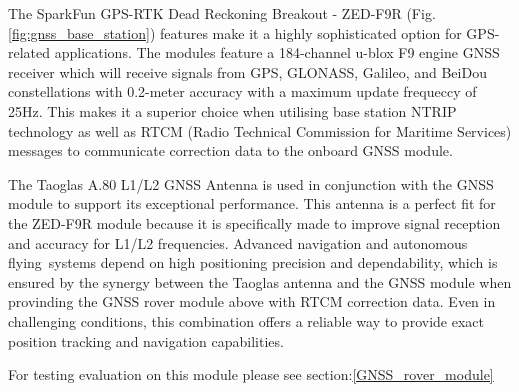 \documentclass{report}
\begin{document}
The SparkFun GPS-RTK Dead Reckoning Breakout - ZED-F9R
(Fig.\ref{fig:gnss_base_station}) features make it a highly sophisticated option
for GPS-related applications. The modules feature a 184-channel u-blox F9 engine
GNSS receiver which will receive signals from GPS, GLONASS, Galileo, and BeiDou
constellations with 0.2-meter accuracy with a maximum update frequeccy of 25Hz.
This makes it a superior choice when utilising base station NTRIP technology as
well as RTCM (Radio Technical Commission for Maritime Services) messages to
communicate correction data to the onboard GNSS module.

The Taoglas A.80 L1/L2 GNSS Antenna is used in conjunction with the GNSS module
to support its exceptional performance. This antenna is a perfect fit for the
ZED-F9R module because it is specifically made to improve signal reception and
accuracy for L1/L2 frequencies. Advanced navigation and autonomous
flying systems depend on high positioning precision and dependability, which is
ensured by the synergy between the Taoglas antenna and the GNSS module when
provinding the GNSS rover module above with RTCM correction data. Even in
challenging conditions, this combination offers a reliable way to provide exact
position tracking and navigation capabilities.

For testing evaluation on this module please see section:\ref{GNSS_rover_module}
\end{document}
